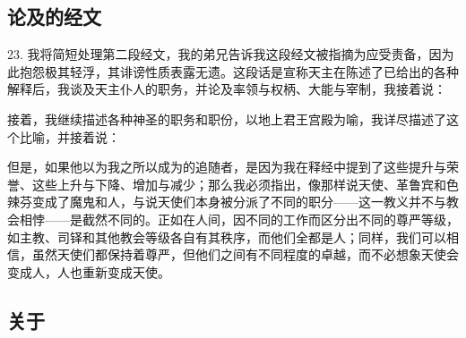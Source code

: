 
\subsection{论及的经文}

23. 我将简短处理第二段经文，我的弟兄告诉我这段经文被指摘为应受责备，因为此抱怨极其轻浮，其诽谤性质表露无遗。这段话是宣称天主在陈述了已给出的各种解释后，我谈及天主仆人的职务，并论及率领与权柄、大能与宰制，我接着说：\par

\par

接着，我继续描述各种神圣的职务和职份，以地上君王宫殿为喻，我详尽描述了这个比喻，并接着说：\par

\par

但是，如果他以为我之所以成为的追随者，是因为我在释经中提到了这些提升与荣誉、这些上升与下降、增加与减少；那么我必须指出，像那样说天使、革鲁宾和色辣芬变成了魔鬼和人，与说天使们本身被分派了不同的职分——这一教义并不与教会相悖——是截然不同的。正如在人间，因不同的工作而区分出不同的尊严等级，如主教、司铎和其他教会等级各自有其秩序，而他们全都是人；同样，我们可以相信，虽然天使们都保持着尊严，但他们之间有不同程度的卓越，而不必想象天使会变成人，人也重新变成天使。\par


\subsection{关于}

